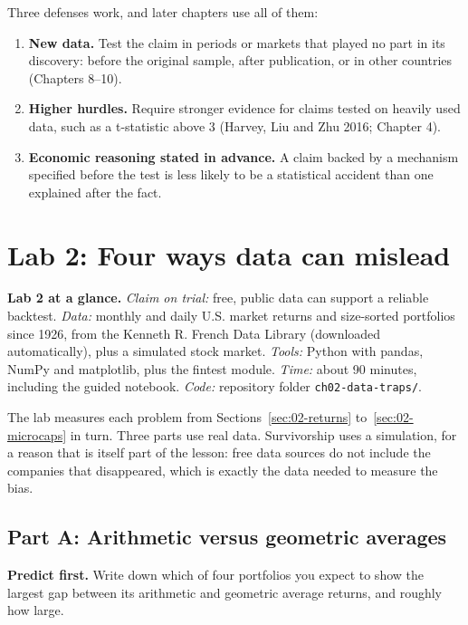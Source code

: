 Three defenses work, and later chapters use all of them:

\begin{enumerate}
  \item \textbf{New data.} Test the claim in periods or markets that played no part in its discovery: before the original sample, after publication, or in other countries (Chapters 8--10).
  \item \textbf{Higher hurdles.} Require stronger evidence for claims tested on heavily used data, such as a t-statistic above 3 (Harvey, Liu and Zhu 2016; Chapter 4).
  \item \textbf{Economic reasoning stated in advance.} A claim backed by a mechanism specified before the test is less likely to be a statistical accident than one explained after the fact.
\end{enumerate}

\section{Lab 2: Four ways data can mislead}
\label{sec:02-lab}

\begin{callout}
\textbf{Lab 2 at a glance.} \emph{Claim on trial:} free, public data can support a reliable backtest. \emph{Data:} monthly and daily U.S. market returns and size-sorted portfolios since 1926, from the Kenneth R. French Data Library (downloaded automatically), plus a simulated stock market. \emph{Tools:} Python with pandas, NumPy and matplotlib, plus the fintest module. \emph{Time:} about 90 minutes, including the guided notebook. \emph{Code:} repository folder \texttt{ch02-data-traps/}.
\end{callout}

The lab measures each problem from Sections~\ref{sec:02-returns} to~\ref{sec:02-microcaps} in turn. Three parts use real data. Survivorship uses a simulation, for a reason that is itself part of the lesson: free data sources do not include the companies that disappeared, which is exactly the data needed to measure the bias.

\subsection*{Part A: Arithmetic versus geometric averages}

\textbf{Predict first.} Write down which of four portfolios you expect to show
the largest gap between its arithmetic and geometric average returns, and
roughly how large.

